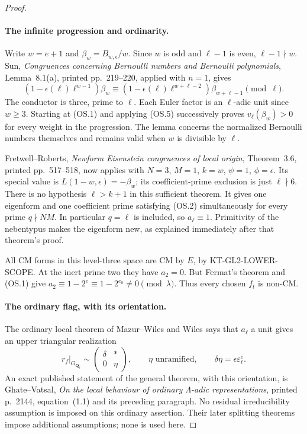 \begin{proof}
\paragraph{The infinite progression and ordinarity.}
Write $w=e+1$ and
$\beta_w=B_{w,\epsilon}/w$. Since $w$ is odd and $\ell-1$
is even, $\ell-1\nmid w$. Sun, \emph{Congruences concerning
Bernoulli numbers and Bernoulli polynomials}, Lemma~8.1(a),
printed pp.~219--220, applied with $n=1$, gives
\[
 (1-\epsilon(\ell)\ell^{w-1})\beta_w
 \equiv
 (1-\epsilon(\ell)\ell^{w+\ell-2})\beta_{w+\ell-1}
                         \pmod\ell.                         \tag{OS.5}
\]
The conductor is three, prime to $\ell$. Each Euler factor
is an $\ell$-adic unit since $w\geq3$. Starting at (OS.1)
and applying (OS.5) successively proves $v_\ell(\beta_w)>0$
for every weight in the progression. The lemma concerns
the normalized Bernoulli numbers themselves and remains
valid when $w$ is divisible by $\ell$.

Fretwell--Roberts, \emph{Newform Eisenstein congruences of
local origin}, Theorem~3.6, printed pp.~517--518, now applies
with $N=3$, $M=1$, $k=w$, $\psi=1$, $\phi=\epsilon$.
Its special value is $L(1-w,\epsilon)=-\beta_w$;
its coefficient-prime exclusion is just $\ell\nmid6$.
There is no hypothesis $\ell>k+1$ in this sufficient theorem.
It gives one eigenform and one coefficient prime satisfying
(OS.2) simultaneously for every prime $q\nmid NM$.
In particular $q=\ell$ is included, so $a_\ell\equiv1$.
Primitivity of the nebentypus makes the eigenform new, as
explained immediately after that theorem's proof.

All CM forms in this level-three space are CM by $E$, by
KT-GL2-LOWER-SCOPE. At the inert prime two they have $a_2=0$.
But Fermat's theorem and (OS.1) give
$a_2\equiv1-2^e\equiv1-2^{e_0}\ne0\pmod\lambda$.
Thus every chosen $f_t$ is non-CM.

\paragraph{The ordinary flag, with its orientation.}
The ordinary local theorem of Mazur--Wiles and Wiles says
that $a_\ell$ a unit gives an upper triangular realization
\[
        r_f|_{G_{\mathbf Q_\ell}}\sim
           \begin{pmatrix}\delta&*\\0&\eta\end{pmatrix},
       \qquad \eta\text{ unramified},\qquad
       \delta\eta=\epsilon\varepsilon_\ell^e.                \tag{OS.6}
\]
An exact published statement of the general theorem, with
this orientation, is Ghate--Vatsal, \emph{On the local
behaviour of ordinary $\Lambda$-adic representations},
printed p.~2144, equation~(1.1) and its preceding paragraph.
No residual irreducibility assumption is imposed on this
ordinary assertion. Their later splitting theorems impose
additional assumptions; none is used here.


\end{proof}
